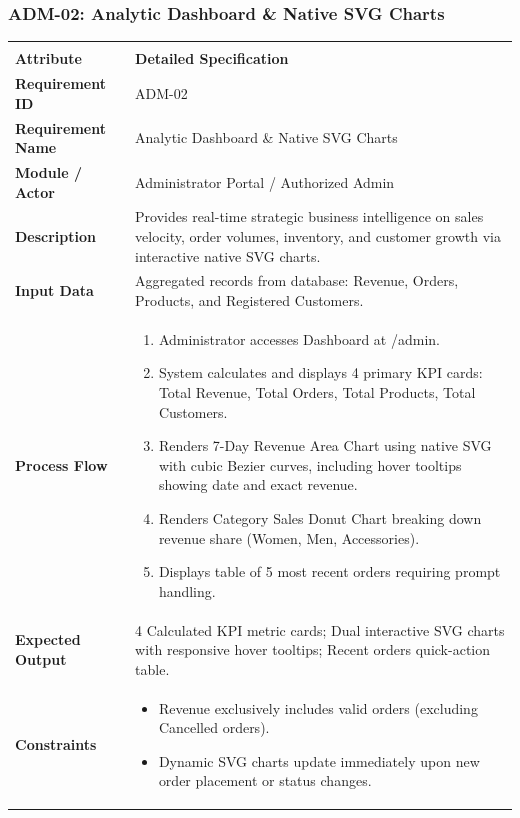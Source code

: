\documentclass[12pt,a4paper,oneside]{report}
\begin{document}
\subsubsection{ADM-02: Analytic Dashboard \& Native SVG Charts}
\begin{longtable}{|p{3.6cm}|p{11.9cm}|}
\hline
\rowcolor{PrimaryBrown}
\multicolumn{2}{|p{15.5cm}|}{\textbf{\textcolor{white}{Functional Specification: ADM-02 -- Analytic Dashboard \& Native SVG Charts}}} \\
\hline
\endfirsthead
\hline
\rowcolor{PrimaryBrown}
\multicolumn{2}{|p{15.5cm}|}{\textbf{\textcolor{white}{Functional Specification: ADM-02 (Continued)}}} \\
\hline
\textbf{Attribute} & \textbf{Detailed Specification} \\
\hline
\endhead
\hline
\endfoot
\textbf{Requirement ID} & ADM-02 \\
\hline
\textbf{Requirement Name} & Analytic Dashboard \& Native SVG Charts \\
\hline
\textbf{Module / Actor} & Administrator Portal / Authorized Admin \\
\hline
\textbf{Description} & Provides real-time strategic business intelligence on sales velocity, order volumes, inventory, and customer growth via interactive native SVG charts. \\
\hline
\textbf{Input Data} & Aggregated records from database: Revenue, Orders, Products, and Registered Customers. \\
\hline
\textbf{Process Flow} & \begin{enumerate}[leftmargin=*,nosep,topsep=2pt]
  \item Administrator accesses Dashboard at /admin.
  \item System calculates and displays 4 primary KPI cards: Total Revenue, Total Orders, Total Products, Total Customers.
  \item Renders 7-Day Revenue Area Chart using native SVG with cubic Bezier curves, including hover tooltips showing date and exact revenue.
  \item Renders Category Sales Donut Chart breaking down revenue share (Women, Men, Accessories).
  \item Displays table of 5 most recent orders requiring prompt handling.
\end{enumerate} \\
\hline
\textbf{Expected Output} & 4 Calculated KPI metric cards; Dual interactive SVG charts with responsive hover tooltips; Recent orders quick-action table. \\
\hline
\textbf{Constraints} & \begin{itemize}[leftmargin=*,nosep,topsep=2pt]
  \item Revenue exclusively includes valid orders (excluding Cancelled orders).
  \item Dynamic SVG charts update immediately upon new order placement or status changes.
\end{itemize} \\
\hline
\end{longtable}
\end{document}
